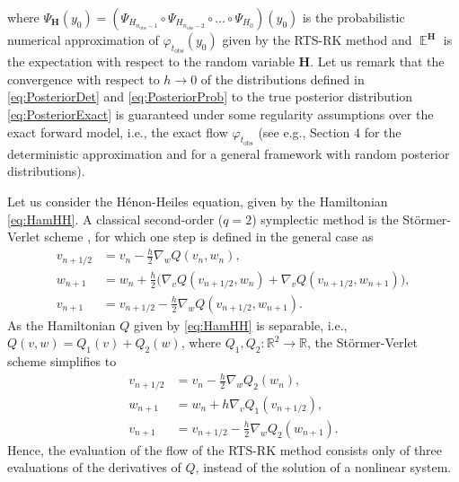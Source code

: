 \documentclass{siamart1116}
\numberwithin{theorem}{section}
\renewcommand{\phi}{\varphi}
\newcommand{\R}{\mathbb{R}}
\newcommand{\E}{\operatorname{\mathbb{E}}}
\newcommand{\corr}[1]{{\color{red}#1}}
\begin{document}
where $\Psi_\mathbf H(y_0) = (\Psi_{H_{n_{\mathrm{obs}}-1}} \circ \Psi_{H_{n_{\mathrm{obs}}-2}} \circ \ldots \circ \Psi_{H_0})(y_0)$ is the probabilistic numerical approximation of $\phi_{t_{\mathrm{obs}}}(y_0)$ given by the RTS-RK method and $\E^\mathbf{H}$ is the expectation with respect to the random variable $\mathbf{H}$. \corr{Let us remark that the convergence with respect to $h \to 0$ of the distributions defined in \eqref{eq:PosteriorDet} and \eqref{eq:PosteriorProb} to the true posterior distribution \eqref{eq:PosteriorExact} is guaranteed under some regularity assumptions over the exact forward model, i.e., the exact flow $\phi_{t_{\mathrm{obs}}}$ (see e.g., \cite{Stu10} Section 4 for the deterministic approximation and \cite{LST17} for a general framework with random posterior distributions).}

Let us consider the Hénon-Heiles equation, given by the Hamiltonian \eqref{eq:HamHH}. A classical second-order ($q = 2$) symplectic method is the Störmer-Verlet scheme \cite{Sto07, Ver67, HLW06}, for which one step is defined in the general case as
\corr{
\begin{equation}
\begin{aligned}
	v_{n+1/2} &= v_n - \frac{h}{2} \nabla_w Q(v_n, w_n), \\
	w_{n+1} &= w_n + \frac{h}{2} \big(\nabla_v Q(v_{n+1/2}, w_n) + \nabla_v Q(v_{n+1/2}, w_{n+1})\big),\\
	v_{n+1} &= v_{n+1/2} - \frac{h}{2} \nabla_w Q(v_{n+1/2}, w_{n+1}).
\end{aligned}
\end{equation}
}
\corr{As the Hamiltonian $Q$ given by \eqref{eq:HamHH} is separable, i.e., $Q(v, w) = Q_1(v) + Q_2(w)$, where $Q_1, Q_2 \colon \R^2 \to \R$, the Störmer-Verlet scheme simplifies to
\begin{equation}
\begin{aligned}
	v_{n+1/2} &= v_n - \frac{h}{2} \nabla_w Q_2(w_n), \\
	w_{n+1} &= w_n + h \nabla_v Q_1(v_{n+1/2}),\\
	v_{n+1} &= v_{n+1/2} - \frac{h}{2} \nabla_w Q_2(w_{n+1}).
\end{aligned}
\end{equation}
Hence, the evaluation of the flow of the RTS-RK method consists only of} three evaluations of the derivatives of $Q$, instead of the solution of a nonlinear system. 
\end{document}

